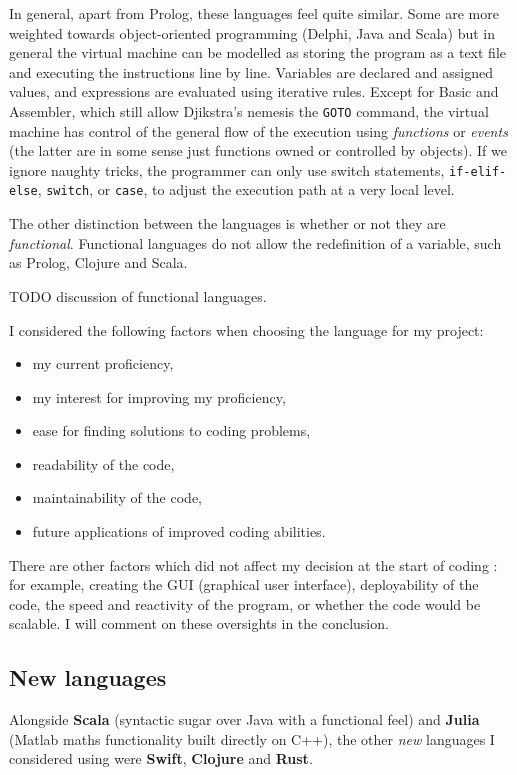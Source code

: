 \documentclass[10pt]{article}
\begin{document}
In general, apart from Prolog, these languages feel quite similar. Some are more weighted towards object-oriented programming (Delphi, Java and Scala) but in general the virtual machine can be modelled as storing the program as a text file and executing the instructions line by line. Variables are declared and assigned values, and expressions are evaluated using iterative rules. Except for Basic and Assembler, which still allow Djikstra's nemesis the \texttt{GOTO} command, the virtual machine has control of the general flow of the execution using \emph{functions} or \emph{events} (the latter are in some sense just functions owned or controlled by objects). If we ignore naughty tricks, the programmer can only use switch statements, \texttt{if-elif-else}, \texttt{switch}, or \texttt{case}, to adjust the execution path at a very local level.

The other distinction between the languages is whether or not they are \emph{functional}. Functional languages do not allow the redefinition of a variable, such as Prolog, Clojure and Scala. 


TODO discussion of functional languages.

I considered the following factors when choosing the language for my project:
\begin{itemize}
\item my current proficiency,
\item my interest for improving my proficiency,
\item ease for finding solutions to coding problems,
\item readability of the code,
\item maintainability of the code,
\item future applications of improved coding abilities.
\end{itemize}

There are other factors which did not affect my decision at the start of coding : for example, creating the GUI (graphical user interface), deployability of the code, the speed and reactivity of the program, or whether the code would be scalable. I will comment on these oversights in the conclusion.



\subsection{New languages}
Alongside \textbf{Scala} (syntactic sugar over Java with a functional feel) and \textbf{Julia} (Matlab maths functionality built directly on C++), the other \emph{new} languages I considered using were \textbf{Swift}, \textbf{Clojure} and \textbf{Rust}.
\end{document}
